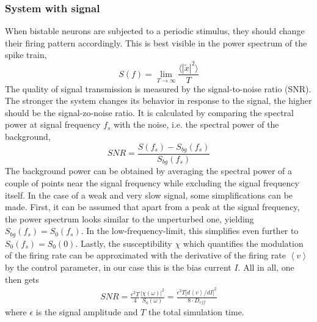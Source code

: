 \documentclass[12pt,a4paper]{article}
\begin{document}
\subsubsection{System with signal}\label{sws}
When bistable neurons are subjected to a periodic stimulus, they should change their firing pattern accordingly. This is best visible in the power spectrum of the spike train, 
\begin{equation}
S(f)=\lim_{T\rightarrow\infty}\frac{\langle|\tilde{x}|^2\rangle}{T}
\end{equation}
The quality of signal transmission is measured by the signal-to-noise ratio (SNR). The stronger the system changes its behavior in response to the signal, the higher should be the signal-zo-noise ratio. It is calculated by comparing the spectral power at signal frequency $f_s$ with the noise, i.e. the spectral power of the background,
\begin{equation}
SNR=\frac{S(f_{s})-S_{bg}(f_{s})}{S_{bg}(f_{s})}
\end{equation}
The background power can be obtained by averaging the spectral power of a couple of points near the signal frequency while excluding the signal frequency itself. In the case of a weak and very slow signal, some simplifications can be made. First, it can be assumed that apart from a peak at the signal frequency, the power spectrum looks similar to the unperturbed one, yielding $S_{bg}(f_s)=S_0(f_s)$. In the low-frequency-limit, this simplifies even further to $S_{0}(f_s)=S_0(0)$. Lastly, the susceptibility $\chi$ which quantifies the modulation of the firing rate can be approximated with the derivative of the firing rate $\left<v\right>$ by the control parameter, in our case this is the bias current $I$. All in all, one then gets
\begin{align}\label{snrweaksig}
SNR=\frac{\epsilon ^2T}{4}\frac{|\chi(\omega)|^2}{S_0(\omega)}=\frac{\epsilon^2T|d\left<v\right>/dI|^2}{8\cdot D_{eff}}
\end{align}
where $\epsilon$ is the signal amplitude and $T$ the total simulation time.
\end{document}
